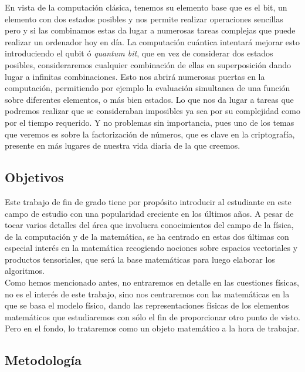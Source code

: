 \documentclass[a4paper]{article}
\numberwithin{equation}{section}
\begin{document}
\linebreak
En vista de la computación clásica, tenemos su elemento base que es el bit, un elemento con dos estados posibles y nos permite realizar operaciones sencillas pero y si las combinamos estas da lugar a numerosas tareas complejas que puede realizar un ordenador hoy en día. La computación cuántica intentará mejorar esto introduciendo el qubit ó \textit{quantum bit}, que en vez de considerar dos estados posibles, consideraremos cualquier combinación de ellas en superposición dando lugar a infinitas combinaciones. Esto nos abrirá numerosas puertas en la computación, permitiendo por ejemplo la evaluación simultanea de una función sobre diferentes elementos, o más bien estados. Lo que nos da lugar a tareas que podremos realizar que se consideraban imposibles ya sea por su complejidad como por el tiempo requerido. Y no problemas sin importancia, pues uno de los temas que veremos es sobre la factorización de números, que es clave en la criptografía, presente en más lugares de nuestra vida diaria de la que creemos.

\subsection{Objetivos}

Este trabajo de fin de grado tiene por propósito introducir al estudiante en este campo de estudio con una popularidad creciente en los últimos años. A pesar de tocar varios detalles del área que involucra conocimientos del campo de la física, de la computación y de la matemática, se ha centrado en estas dos últimas con especial interés en la matemática recogiendo nociones sobre espacios vectoriales y productos tensoriales, que será la base matemáticas para luego elaborar los algoritmos.\\
\linebreak
Como hemos mencionado antes, no entraremos en detalle en las cuestiones físicas, no es el interés de este trabajo, sino nos centraremos con las matemáticas en la que se basa el modelo físico, dando las representaciones físicas de los elementos matemáticos que estudiaremos con sólo el fin de proporcionar otro punto de visto. Pero en el fondo, lo trataremos como un objeto matemático a la hora de trabajar.\\

\subsection{Metodología}
\end{document}
